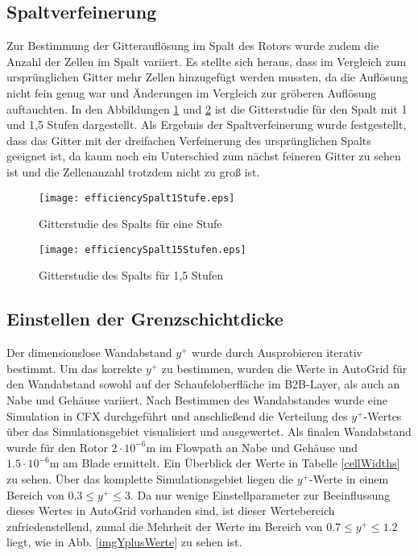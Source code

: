 \subsection{Spaltverfeinerung}

Zur Bestimmung der Gitterauflösung im Spalt des Rotors wurde zudem die Anzahl der Zellen im Spalt variiert. Es stellte sich heraus, dass im Vergleich zum ursprünglichen Gitter mehr Zellen hinzugefügt werden mussten, da die Auflösung nicht fein genug war und Änderungen im Vergleich zur gröberen Auflösung auftauchten. In den Abbildungen \ref{effSpalt1} und \ref{effSpalt15} ist die Gitterstudie für den Spalt mit 1 und 1,5 Stufen dargestellt. Als Ergebnis der Spaltverfeinerung wurde festgestellt, dass das Gitter mit der dreifachen Verfeinerung des ursprünglichen Spalts geeignet ist, da kaum noch ein Unterschied zum nächst feineren Gitter zu sehen ist und die Zellenanzahl trotzdem nicht zu groß ist.


\begin{figure}[H]
	\centering
	\texttt{[image: efficiencySpalt1Stufe.eps]}
	\caption{Gitterstudie des Spalts für eine Stufe} \label{effSpalt1}
\end{figure}

\begin{figure}[H]
	\centering
	\texttt{[image: efficiencySpalt15Stufen.eps]}
	\caption{Gitterstudie des Spalts für 1,5 Stufen} \label{effSpalt15}
\end{figure}

\subsection{Einstellen der Grenzschichtdicke}
 Der dimensionslose Wandabstand $y^+$ wurde durch Ausprobieren iterativ bestimmt. Um das korrekte $y^+$ zu bestimmen, wurden die Werte in AutoGrid für den Wandabstand sowohl auf der Schaufeloberfläche im B2B-Layer, als auch an Nabe und Gehäuse variiert.  Nach Bestimmen des Wandabstandes wurde eine Simulation in CFX durchgeführt und anschließend die Verteilung des $y^+$-Wertes über das Simulationsgebiet visualisiert und ausgewertet. Als finalen Wandabstand wurde für den Rotor $2\cdot 10^{-6}\text{m}$ im Flowpath an Nabe und Gehäuse und $1.5\cdot 10^{-6}\text{m}$ am Blade ermittelt. Ein Überblick der Werte in Tabelle \ref{cellWidths} zu sehen. Über das komplette Simulationsgebiet liegen die $y^+$-Werte in einem Bereich von $0.3 \leq y^+ \leq 3$. Da nur wenige Einstellparameter zur Beeinflussung dieses Wertes in AutoGrid vorhanden sind, ist dieser Wertebereich zufriedenstellend, zumal die Mehrheit der Werte im Bereich von $0.7 \leq y^+ \leq 1.2$  liegt, wie in Abb. \ref{imgYplusWerte} zu sehen ist. 

